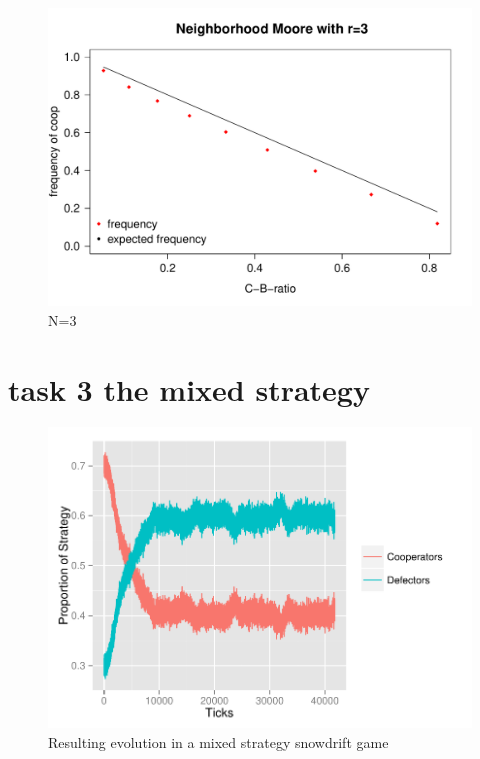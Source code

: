 \documentclass[DIV=calc, paper=a4, fontsize=11pt, twocolumn]{scrartcl}	 %
\begin{document}
\begin{figure}[here]
\begin{minipage}{.40\textwidth}
  \centering
  \includegraphics[width=1\linewidth]{HDm3}
 \caption{N=3}
\label{fig:HDm3}
\end{minipage}%
\end{figure}

\section*{task 3 the mixed strategy}

\begin{figure}[here]
  \centering
  \includegraphics[width=1\linewidth]{task3}
 \caption{Resulting evolution in a mixed strategy snowdrift game}
\label{fig:task3}
\end{figure}
\end{document}
